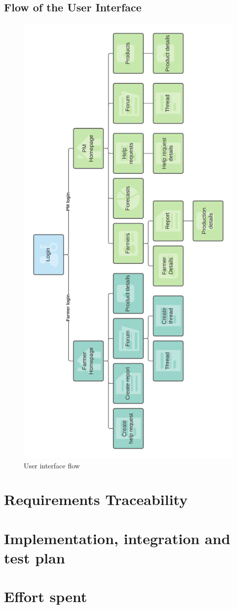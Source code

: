 \documentclass[10pt]{article} %
\begin{document}
\subsection{Flow of the User Interface}
\begin{figure}[h]
    \centering
    \includegraphics[scale=0.6]{images/uimockups/ui_flow.png}
    \caption{User interface flow}
    \label{fig:ui_flow}
\end{figure}
\section{Requirements Traceability}

\section{Implementation, integration and test plan}

\section{Effort spent}


\end{document}
